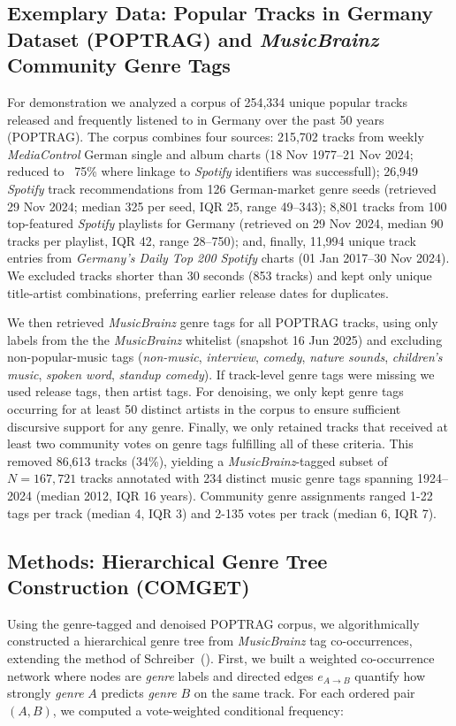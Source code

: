 \documentclass{article}
\begin{document}
\subsection{Exemplary Data: Popular Tracks in Germany Dataset (POPTRAG) and \textit{MusicBrainz} Community Genre Tags}
For demonstration we analyzed a corpus of 254,334 unique popular tracks released and frequently listened to in Germany over the past 50 years (POPTRAG). The corpus combines four sources: 215,702 tracks from weekly \textit{MediaControl} German single and album charts (18 Nov 1977–21 Nov 2024; reduced to ~75\% where linkage to \textit{Spotify} identifiers was successfull); 26,949 \textit{Spotify} track recommendations from 126 German-market genre seeds (retrieved 29 Nov 2024; median 325 per seed, IQR 25, range 49–343); 8,801 tracks from 100 top-featured \textit{Spotify} playlists for Germany (retrieved on 29 Nov 2024, median 90 tracks per playlist, IQR 42, range 28–750); and, finally, 11,994 unique track entries from \textit{Germany's Daily Top 200 Spotify} charts (01 Jan 2017–30 Nov 2024). We excluded tracks shorter than 30 seconds (853 tracks) and kept only unique title-artist combinations, preferring earlier release dates for duplicates.

We then retrieved \textit{MusicBrainz}  genre tags for all POPTRAG tracks, using only labels from the the \textit{MusicBrainz} whitelist (snapshot 16 Jun 2025) and excluding non-popular-music tags (\textit{non-music}, \textit{interview}, \textit{comedy}, \textit{nature sounds}, \textit{children's music}, \textit{spoken word}, \textit{standup comedy}).  If track-level genre tags were missing we used release tags, then artist tags.
For denoising, we  only kept genre tags occurring for at least 50 distinct artists in the corpus to ensure sufficient discursive support for any genre. Finally, we only retained tracks that received at least two community votes on genre tags fulfilling all of these criteria. This removed 86,613 tracks (34\%), yielding a \textit{MusicBrainz}-tagged subset of $N = 167,721$ tracks annotated with 234 distinct music genre tags spanning 1924–2024 (median 2012, IQR 16 years).  Community genre assignments ranged 1-22 tags per track (median 4, IQR 3) and 2-135 votes per track (median 6, IQR 7).  

\subsection{Methods: Hierarchical Genre Tree Construction (COMGET)}
Using the genre-tagged and denoised POPTRAG corpus, we algorithmically constructed a hierarchical genre tree from \textit{MusicBrainz} tag co-occurrences, extending the method of Schreiber~(\citeyear{schreiberImprovingGenreAnnotations2015}). First, we built a weighted co-occurrence network where nodes are \textit{genre} labels and directed edges $e_{A\rightarrow B}$ quantify how strongly \textit{genre} $A$ predicts \textit{genre} $B$ on the same track. For each ordered pair $(A,B)$, we computed a vote-weighted conditional frequency:
\end{document}
